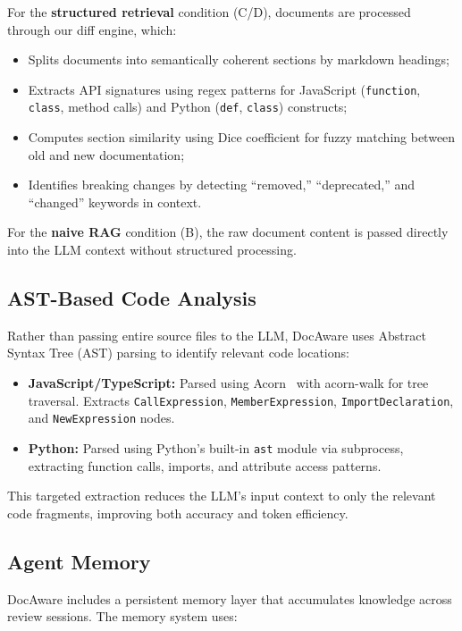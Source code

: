 \documentclass[sigconf,nonacm]{acmart}
\begin{document}
For the \textbf{structured retrieval} condition (C/D), documents are processed through our diff engine, which:
\begin{itemize}
    \item Splits documents into semantically coherent sections by markdown headings;
    \item Extracts API signatures using regex patterns for JavaScript (\texttt{function}, \texttt{class}, method calls) and Python (\texttt{def}, \texttt{class}) constructs;
    \item Computes section similarity using Dice coefficient for fuzzy matching between old and new documentation;
    \item Identifies breaking changes by detecting ``removed,'' ``deprecated,'' and ``changed'' keywords in context.
\end{itemize}

For the \textbf{naive RAG} condition (B), the raw document content is passed directly into the LLM context without structured processing.

\subsection{AST-Based Code Analysis}
\label{sec:code-analysis}

Rather than passing entire source files to the LLM, DocAware uses Abstract Syntax Tree (AST) parsing to identify relevant code locations:

\begin{itemize}
    \item \textbf{JavaScript/TypeScript:} Parsed using Acorn~\cite{acorn} with acorn-walk for tree traversal. Extracts \texttt{CallExpression}, \texttt{MemberExpression}, \texttt{ImportDeclaration}, and \texttt{NewExpression} nodes.
    \item \textbf{Python:} Parsed using Python's built-in \texttt{ast} module via subprocess, extracting function calls, imports, and attribute access patterns.
\end{itemize}

This targeted extraction reduces the LLM's input context to only the relevant code fragments, improving both accuracy and token efficiency.

\subsection{Agent Memory}
\label{sec:memory}

DocAware includes a persistent memory layer that accumulates knowledge across review sessions. The memory system uses:
\end{document}
